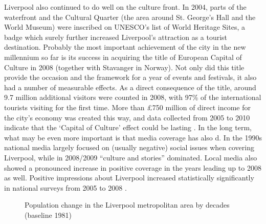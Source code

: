 Liverpool also continued to do well on the culture front.
In 2004, parts of the waterfront and the Cultural Quarter (the area around St. George's Hall and the World Museum) were inscribed on UNESCO's list of World Heritage Sites, a badge which surely further increased Liverpool's attraction as a tourist destination.
Probably the most important achievement of the city in the new millennium so far is its success in acquiring the title of European Capital of Culture in 2008 (together with Stavanger in Norway).
Not only did this title provide the occasion and the framework for a year of events and festivals, it also had a number of measurable effects.
As a direct consequence of the title, around 9.7 million additional visitors were counted in 2008, with 97\% of the international tourists visiting for the first time.
More than £750 million of direct income for the city's economy was created this way, and data collected from 2005 to 2010 indicate that the `Capital of Culture' effect could be lasting \parencite{garciaetal2010}.
In the long term, what may be even more important is that media coverage has also d.
In the 1990s national media largely focused on (usually negative) social issues when covering Liverpool, while in 2008/2009 ``culture and  stories'' dominated.
Local media also showed a pronounced increase in positive coverage in the years leading up to 2008 as well.
Positive impressions about Liverpool increased statistically significantly in national surveys from 2005 to 2008 \citep[cf.][25 and 44--46]{garciaetal2010}.

	\begin{figure}[h]
		\centering
		
		\caption[Population change in the Liverpool area]{Population change in the Liverpool metropolitan area by decades (baseline 1981)}
		\label{fig.population}
	\end{figure}

